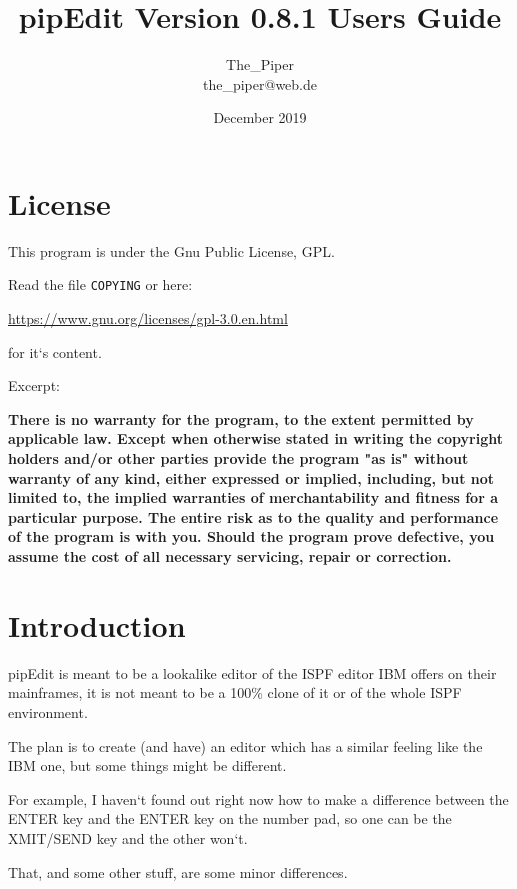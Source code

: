 \documentclass{report}
\title{\huge \textbf{pipEdit} 
\break \break \small Version 0.8.1 \huge 
\break \break Users Guide \break \break \break}
\author{The\_Piper \\ the\_piper@web.de}
\date{December 2019}
\begin{document}
\maketitle
\tableofcontents
\chapter{License}
This program is under the Gnu Public License, GPL.  \\ \break

Read the file \texttt{COPYING} or here:  \\ \break

\url{https://www.gnu.org/licenses/gpl-3.0.en.html}   \\ \break

for it‘s content. \\ \break

Excerpt: \\ \break

\textbf{    There is no warranty for the program, to the extent permitted by
	 applicable law.  Except when otherwise stated in writing the copyright
	 holders and/or other parties provide the program "as is" without warranty
	 of any kind, either expressed or implied, including, but not limited to,
	 the implied warranties of merchantability and fitness for a particular
	 purpose.  
	 \huge The entire risk as to the quality and performance of the program is with you. \normalsize
	 Should the program prove defective, you assume the cost of
	 all necessary servicing, repair or correction.
}

\chapter{Introduction}

pipEdit is meant to be a lookalike editor of the ISPF editor IBM offers on their mainframes, it is not meant to be a 100\% clone of it or of the whole ISPF environment. 


The plan is to create (and have) an editor which has a similar feeling like the IBM one, but some things might be different. 


For example, I haven‘t found out right now how to make a difference between the ENTER key and the ENTER key on the number pad, so one can be the XMIT/SEND key and the other won‘t.


That, and some other stuff, are some minor differences.
\end{document}
